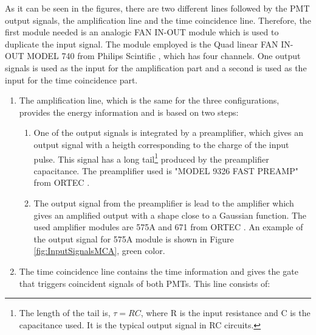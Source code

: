 As it can be seen in the figures, there are two different lines followed by the PMT output signals, the amplification line and the time coincidence line. Therefore, the first module needed is an analogic FAN IN-OUT module which is used to duplicate the input signal. The module employed is the Quad linear FAN IN-OUT MODEL 740 from Philips Scintific \cite{DataSheetFANINOUT}, which has four channels. One output signals is used as the input for the amplification part and a second is used as the input for the time coincidence part.

\begin{enumerate}

\item{} The amplification line, which is the same for the three configurations, provides the energy information and is based on two steps:



\begin{enumerate}

\item{} One of the output signals is integrated by a preamplifier, which gives an output signal with a heigth corresponding to the charge of the input pulse. This signal has a long tail\footnote{The length of the tail is, $\tau=RC$, where R is the input resistance and C is the capacitance used. It is the typical output signal in RC circuits.} produced by the preamplifier capacitance. The preamplifier used is "MODEL 9326 FAST PREAMP" from ORTEC \cite{DataSheetPreAmp}.

\item{} The output signal from the preamplifier is lead to the amplifier which gives an amplified output with a shape close to a Gaussian function. The used  amplifier modules are 575A and 671 from ORTEC \cite{DataSheet575Amp, DataSheet671Amp}. An example of the output signal for 575A module is shown in Figure \ref{fig:InputSignalsMCA}, green color.

\end{enumerate}

\item{} The time coincidence line contains the time information and gives the gate that triggers coincident signals of both PMTs. This line consists of:


\end{enumerate}
